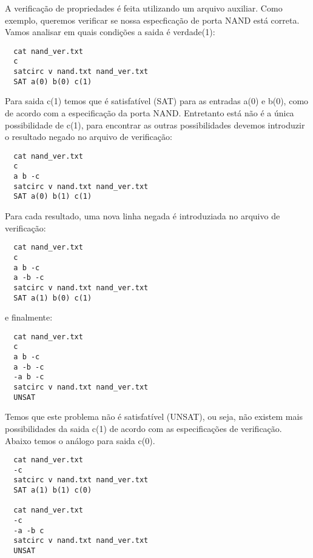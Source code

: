 A verificação de propriedades é feita utilizando um arquivo auxiliar. Como
exemplo, queremos verificar se nossa especficação de porta NAND está correta.
Vamos analisar em quais condições a saida é verdade(1):
\begin{lstlisting}
  cat nand_ver.txt
  c
  satcirc v nand.txt nand_ver.txt
  SAT a(0) b(0) c(1)
\end{lstlisting}
Para saida c(1) temos que é satisfatível (SAT) para as entradas a(0) e b(0),
como de acordo com a especificação da porta NAND. Entretanto está não é a
única possibilidade de c(1), para encontrar as outras possibilidades devemos
introduzir o resultado negado no arquivo de verificação:
\begin{lstlisting}
  cat nand_ver.txt
  c
  a b -c
  satcirc v nand.txt nand_ver.txt
  SAT a(0) b(1) c(1)
\end{lstlisting}
Para cada resultado, uma nova linha negada é introduziada no arquivo de
verificação:
\begin{lstlisting}
  cat nand_ver.txt
  c
  a b -c
  a -b -c
  satcirc v nand.txt nand_ver.txt
  SAT a(1) b(0) c(1)
\end{lstlisting}
e finalmente:
\begin{lstlisting}
  cat nand_ver.txt
  c
  a b -c
  a -b -c
  -a b -c
  satcirc v nand.txt nand_ver.txt
  UNSAT
\end{lstlisting}
Temos que este problema não é satisfatível (UNSAT), ou seja, não existem mais
possibilidades da saida c(1) de acordo com as especificações de
verificação. Abaixo temos o análogo para saida c(0).
\begin{lstlisting}
  cat nand_ver.txt
  -c
  satcirc v nand.txt nand_ver.txt
  SAT a(1) b(1) c(0)
  
  cat nand_ver.txt
  -c
  -a -b c
  satcirc v nand.txt nand_ver.txt
  UNSAT
\end{lstlisting}